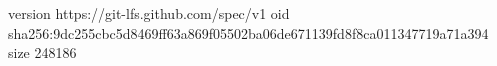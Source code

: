 version https://git-lfs.github.com/spec/v1
oid sha256:9dc255cbc5d8469ff63a869f05502ba06de671139fd8f8ca011347719a71a394
size 248186
